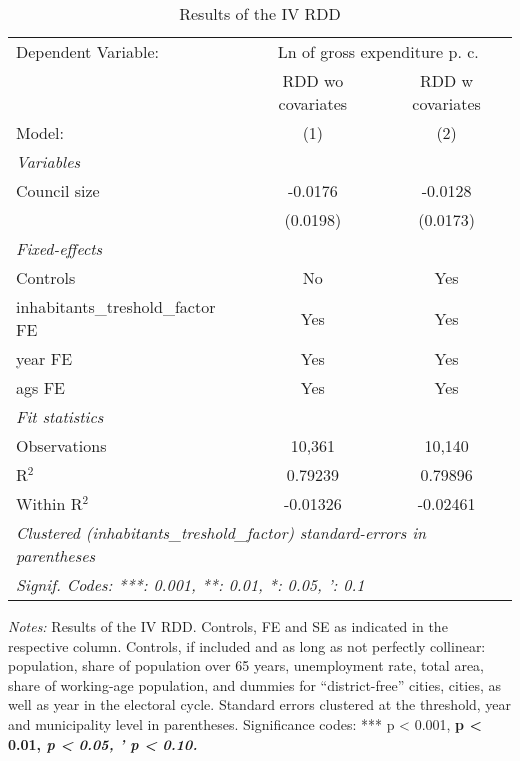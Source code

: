 
\begin{table}[htbp]
   \caption{\label{tab:rdd_iv} Results of the \ac{IV} \ac{RDD}}
   \centering
   \begin{tabular}{lcc}
      \tabularnewline \midrule \midrule
      Dependent Variable: & \multicolumn{2}{c}{Ln of gross expenditure p. c.}\\
                                               & \acs{RDD} \acs{wo} covariates   & \acs{RDD} \acs{w} covariates \\     
      Model:                                   & (1)                             & (2)\\  
      \midrule
      \emph{Variables}\\
      Council size                             & -0.0176                         & -0.0128\\   
                                               & (0.0198)                        & (0.0173)\\   
      \midrule
      \emph{Fixed-effects}\\
      Controls                                 & No                              & Yes\\  
      inhabitants\_treshold\_factor \ac{FE}    & Yes                             & Yes\\  
      year \ac{FE}                             & Yes                             & Yes\\  
      ags \ac{FE}                              & Yes                             & Yes\\  
      \midrule
      \emph{Fit statistics}\\
      Observations                             & 10,361                          & 10,140\\  
      R$^2$                                    & 0.79239                         & 0.79896\\  
      Within R$^2$                             & -0.01326                        & -0.02461\\  
      \midrule \midrule
      \multicolumn{3}{l}{\emph{Clustered (inhabitants\_treshold\_factor) standard-errors in parentheses}}\\
      \multicolumn{3}{l}{\emph{Signif. Codes: ***: 0.001, **: 0.01, *: 0.05, ': 0.1}}\\
   \end{tabular}
   
   \par \raggedright 
   \footnotesize{\textit{Notes:} Results of the \ac{IV} \ac{RDD}. Controls, \ac{FE} and \ac{SE} as indicated in the respective column. Controls, if included and as long as not perfectly collinear: population, share of population over 65 years, unemployment rate, total area, share of working-age population, and dummies for ``district-free'' cities, cities, as well as year in the electoral cycle. Standard errors clustered at the threshold, year and municipality level in parentheses. Significance codes: *** p < 0.001, \textbf{ p < 0.01, \textit{ p < 0.05, ' p < 0.10.}}}
\end{table}


